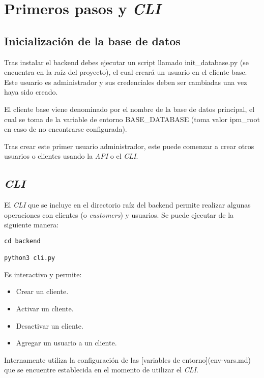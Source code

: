 \chapter{Primeros pasos y \textit{CLI}}

\section{Inicialización de la base de datos}
Tras instalar el backend debes ejecutar un script llamado \textsf{init\_database.py} (se encuentra en la raíz del proyecto), el cual creará un usuario en el cliente base. Este usuario es administrador y sus credenciales deben ser cambiadas una vez haya sido creado.

El cliente base viene denominado por el nombre de la base de datos principal, el cual se toma de la variable de entorno \textsf{BASE\_DATABASE} (toma valor \textsf{ipm\_root} en caso de no encontrarse configurada).

Tras crear este primer usuario administrador, este puede comenzar a crear otros usuarios o clientes usando la \textit{API} o el \textit{CLI}.

\section{\textit{CLI}}

El \textit{CLI} que se incluye en el directorio raíz del backend permite realizar algunas operaciones con clientes (o \textit{customers}) y usuarios. Se puede ejecutar de la siguiente manera:

\begin{lstlisting}
cd backend

python3 cli.py
\end{lstlisting}

Es interactivo y permite:

\begin{itemize}
	\item Crear un cliente.
	\item Activar un cliente.
	\item Desactivar un cliente.
	\item Agregar un usuario a un cliente.
\end{itemize}

Internamente utiliza la configuración de las [variables de entorno](env-vars.md) que se encuentre establecida en el momento de utilizar el \textit{CLI}.